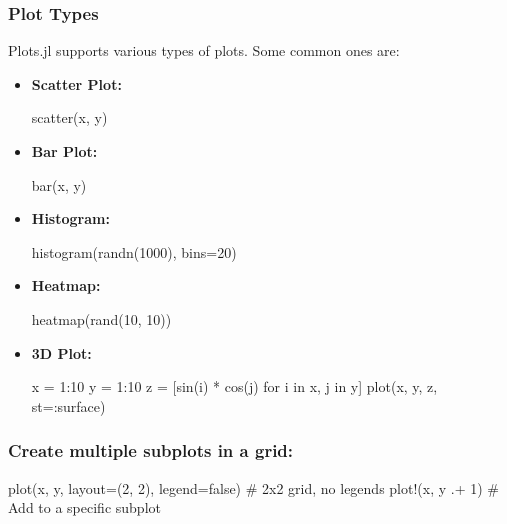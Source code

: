 \documentclass{report}
\begin{document}
     \subsubsection{Plot Types}
     \bigbreak \noindent 
     Plots.jl supports various types of plots. Some common ones are:
     \bigbreak \noindent 
     \begin{itemize}
         \item \textbf{Scatter Plot:}
             \bigbreak \noindent 
             \begin{jlcode}
             scatter(x, y)
             \end{jlcode}
         \item \textbf{Bar Plot:}
             \bigbreak \noindent 
             \begin{jlcode}
             bar(x, y)
             \end{jlcode}
         \item \textbf{Histogram:}
             \bigbreak \noindent 
             \begin{jlcode}
             histogram(randn(1000), bins=20)
             \end{jlcode}
         \item \textbf{Heatmap:}
             \bigbreak \noindent 
             \begin{jlcode}
             heatmap(rand(10, 10))
             \end{jlcode}
         \item \textbf{3D Plot:}
             \bigbreak \noindent 
             \begin{jlcode}
                 x = 1:10
                 y = 1:10
                 z = [sin(i) * cos(j) for i in x, j in y]
                 plot(x, y, z, st=:surface)
             \end{jlcode}
     \end{itemize}

     \bigbreak \noindent 
     \subsubsection{Create multiple subplots in a grid: }
     \bigbreak \noindent 
     \begin{jlcode}
     plot(x, y, layout=(2, 2), legend=false)  # 2x2 grid, no legends
    plot!(x, y .+ 1)  # Add to a specific subplot
     \end{jlcode}
























    
\end{document}
